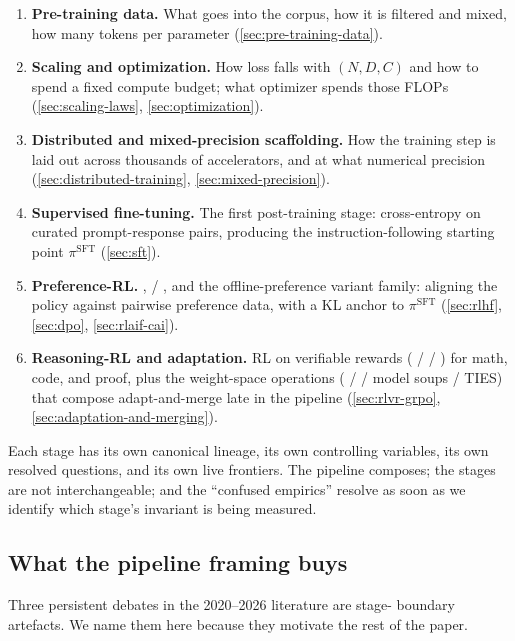 \begin{enumerate}
\item \textbf{Pre-training data.} What goes into the corpus, how it is
  filtered and mixed, how many tokens per parameter
  (\cref{sec:pre-training-data}).
\item \textbf{Scaling and optimization.} How loss falls with $(N, D, C)$
  and how to spend a fixed compute budget; what optimizer spends those
  FLOPs (\cref{sec:scaling-laws}, \cref{sec:optimization}).
\item \textbf{Distributed and mixed-precision scaffolding.} How the
  training step is laid out across thousands of accelerators, and at
  what numerical precision (\cref{sec:distributed-training},
  \cref{sec:mixed-precision}).
\item \textbf{Supervised fine-tuning.} The first post-training stage:
  cross-entropy on curated prompt-response pairs, producing the
  instruction-following starting point $\pi^{\mathrm{SFT}}$
  (\cref{sec:sft}).
\item \textbf{Preference-RL.} ,  / ,  and
  the offline-preference variant family: aligning the policy against
  pairwise preference data, with a KL anchor to $\pi^{\mathrm{SFT}}$
  (\cref{sec:rlhf}, \cref{sec:dpo}, \cref{sec:rlaif-cai}).
\item \textbf{Reasoning-RL and adaptation.} RL on verifiable rewards
  ( /  / ) for math, code, and proof, plus the weight-space
  operations ( /  / model soups / TIES) that compose
  adapt-and-merge late in the pipeline
  (\cref{sec:rlvr-grpo}, \cref{sec:adaptation-and-merging}).
\end{enumerate}
Each stage has its own canonical lineage, its own controlling
variables, its own resolved questions, and its own live frontiers. The
pipeline composes; the stages are not interchangeable; and the
``confused empirics'' resolve as soon as we identify which stage's
invariant is being measured.

\subsection{What the pipeline framing buys}
\label{sec:intro-buy}

Three persistent debates in the 2020--2026 literature are stage-
boundary artefacts. We name them here because they motivate the rest of
the paper.

